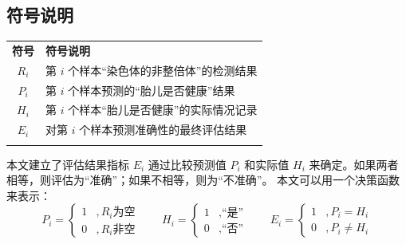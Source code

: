 \subsection{符号说明}

\begin{center}
    \begin{tabularx}{0.8\textwidth}{c@{\hspace{1pc}}|@{\hspace{2pc}}>{\centering\arraybackslash}X}
        \Xhline{0.08em} %
        \textbf{符号} & \textbf{符号说明}            \\
        \Xhline{0.05em}
        $R_i$       & 第 $i$ 个样本“染色体的非整倍体”的检测结果 \\
        $P_i$       & 第 $i$ 个样本预测的“胎儿是否健康”结果   \\
        $H_i$       & 第 $i$ 个样本“胎儿是否健康”的实际情况记录 \\
        $E_i$       & 对第 $i$ 个样本预测准确性的最终评估结果   \\
        \Xhline{0.08em}
    \end{tabularx}
\end{center}

本文建立了评估结果指标 $E_i$ 通过比较预测值 $P_i$ 和实际值 $H_i$ 来确定。如果两者相等，则评估为“准确”；如果不相等，则为“不准确”。
本文可以用一个决策函数来表示：
\begin{equation}
    P_i =
    \begin{cases}
        1 & ,R_i \text{为空} \\
        0 & ,R_i \text{非空}
    \end{cases}
    \quad \quad
    H_i =
    \begin{cases}
        1 & ,\text{“是”} \\
        0 & ,\text{“否”}
    \end{cases}
    \quad \quad
    E_i =
    \begin{cases}
        1 & ,P_i = H_i    \\
        0 & ,P_i \neq H_i
    \end{cases}
\end{equation}


